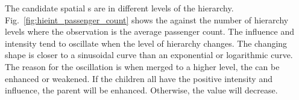 The candidate spatial {\explanation}s are in different levels of the hierarchy. 
Fig.~\ref{fig:hieint_passenger_count} shows the {\influence} against the number of hierarchy levels where the observation is the average passenger count. 
The influence and intensity tend to oscillate when the level of hierarchy changes.
The changing shape is closer to a sinusoidal curve than an exponential or logarithmic curve. 
The reason for the oscillation is when merged to a higher level, the {\explanation} can be enhanced or weakened. 
If the children {\explanation} all have the positive intensity and influence, the parent {\explanation} will be enhanced. 
Otherwise, the value will decrease. 



